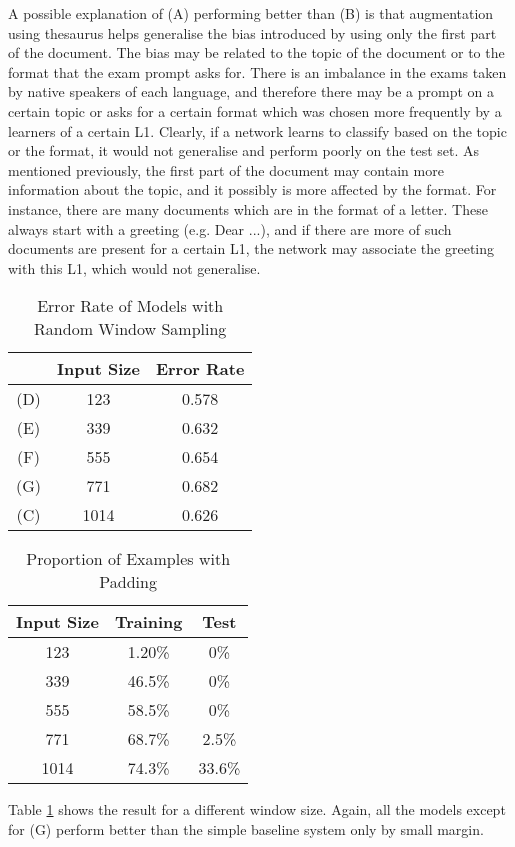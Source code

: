 A possible explanation of (A) performing better than (B) is that augmentation using thesaurus helps generalise the bias introduced by using only the first part of the document.
The bias may be related to the topic of the document or to the format that the exam prompt asks for.
There is an imbalance in the exams taken by native speakers of each language, and therefore there may be a prompt on a certain topic or asks for a certain format which was chosen more frequently by a learners of a certain L1. 
Clearly, if a network learns to classify based on the topic or the format, it would not generalise and perform poorly on the test set.
As mentioned previously, the first part of the document may contain more information about the topic, and it possibly is more affected by the format.
For instance, there are many documents which are in the format of a letter.
These always start with a greeting (e.g. Dear ...), and if there are more of such documents are present for a certain L1, the network may associate the greeting with this L1, which would not generalise.

\begin{table}[]
\centering
\caption{Error Rate of Models with Random Window Sampling}
\label{tab:r_w_s}
\begin{tabular}{ccc}
&Input Size & Error Rate \\ \hline
(D)&123        & 0.578      \\
(E)&339        & 0.632      \\
(F)&555        & 0.654      \\
(G)&771        & 0.682      \\
(C)&1014       & 0.626    
\end{tabular}
\end{table}
\begin{table}[]
\centering
\caption{Proportion of Examples with Padding}
\label{tab:padding}
\begin{tabular}{ccc}
Input Size & Training & Test \\ \hline
123        & 1.20\%  &   0\% \\
339        & 46.5\%    & 0\%\\
555        & 58.5\%    & 0\% \\
771        & 68.7\%     &2.5\% \\
1014       & 74.3\%    &33.6\%
\end{tabular}
\end{table}
Table \ref{tab:r_w_s} shows the result for a different window size.
Again, all the models except for (G) perform better than the simple baseline system only by small margin.

